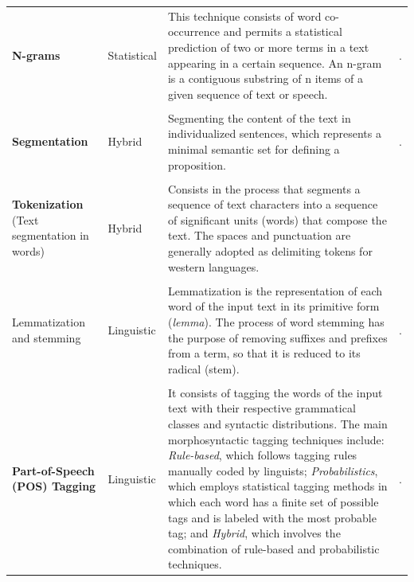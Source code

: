 \documentclass[english]{textolivre}
\begin{document}
\begin{longtable}{p{3cm}p{2cm}p{7cm}p{3.5cm}}
{\footnotesize \textbf{N-grams}} & {\footnotesize Statistical} & {\footnotesize This technique consists of word co-occurrence and permits a statistical prediction of two or more terms in a text appearing in a certain sequence. An n-gram is a contiguous substring of n items of a given sequence of text or speech.} & {\footnotesize \textcite{cohen_highlights:_1995,liu_extractive_2009,alencar_aelius:_2010,alencar_aelius_2013a,tonelli_matching_2011}.}\\
\\

{\footnotesize \textbf{Segmentation}} & {\footnotesize Hybrid} & {\footnotesize Segmenting the content of the text in individualized sentences, which represents a minimal semantic set for defining a proposition.} & {\footnotesize \textcite{lin_discovering_2009,sousa_e-dictor:_2010,alencar_aelius_2013b}.}\\
\\ 
{\footnotesize \textbf{Tokenization} (Text segmentation in words)} & {\footnotesize Hybrid} & {\footnotesize Consists in the process that segments a sequence of text characters into a sequence of significant units (words) that compose the text. The spaces and punctuation are generally adopted as delimiting tokens for western languages.} & {\footnotesize \textcite{webster_tokenization_1992,sousa_e-dictor:_2010,alencar_aelius_2013b,silva_mineracao_2015}}\\
\\
{\footnotesize Lemmatization and stemming} & {\footnotesize Linguistic} & {\footnotesize Lemmatization is the representation of each word of the input text in its primitive form (\textit{lemma}). The process of word stemming has the purpose of removing suffixes and prefixes from a term, so that it is reduced to its radical (stem).} & {\footnotesize \textcite{lovins_development_1968,sousa_e-dictor:_2010,rolim_identificacao_2016}.} \\
\\ 
{\footnotesize \textbf{Part-of-Speech (POS) Tagging}} & {\footnotesize Linguistic} & {\footnotesize It consists of tagging the words of the input text with their respective grammatical classes and syntactic distributions. The main morphosyntactic tagging techniques include: \textit{Rule-based}, which follows tagging rules manually coded by linguists; \textit{Probabilistics}, which employs statistical tagging methods in which each word has a finite set of possible tags and is labeled with the most probable tag; and \textit{Hybrid}, which involves the combination of rule-based and probabilistic techniques.} & {\footnotesize \textcite{lau_towards_2008,domingues_o_2008,sousa_e-dictor:_2010,alencar_aelius_2013b,santos_learning_2014}.}\\

\end{longtable}
\end{document}
